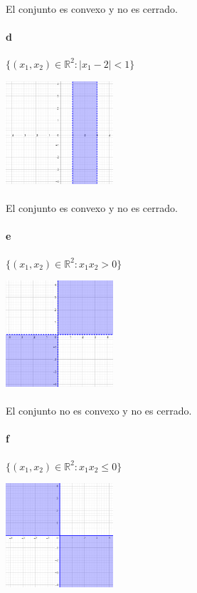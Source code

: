 \documentclass{article}
\begin{document}
	\paragraph{}El conjunto es convexo y no es cerrado.
	\paragraph{d} $\{ (x_1, x_2) \in \mathbb{R}^2: |x_1 - 2| < 1 \}$
	\begin{center}
		\includegraphics[width=0.3\textwidth]{d}
	\end{center}
	\paragraph{}El conjunto es convexo y no es cerrado.
	\paragraph{e} $\{ (x_1,x_2) \in \mathbb{R}^2: x_1 x_2 > 0 \}$
	\begin{center}
		\includegraphics[width=0.3\textwidth]{e}
	\end{center}
	\paragraph{}El conjunto no es convexo y no es cerrado.
	\newpage
	\paragraph{f} $\{ (x_1,x_2) \in \mathbb{R}^2: x_1 x_2 \leq 0 \}$
	\begin{center}
		\includegraphics[width=0.3\textwidth]{f}
	\end{center}
\end{document}
